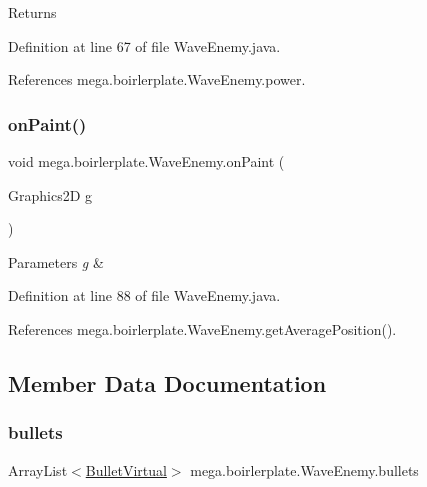 \begin{DoxyReturn}{Returns}

\end{DoxyReturn}


Definition at line 67 of file Wave\+Enemy.\+java.



References mega.\+boirlerplate.\+Wave\+Enemy.\+power.

\mbox{\label{classmega_1_1boirlerplate_1_1_wave_enemy_ab9c8931b661bfa995f124272462537a5}} 
\subsubsection{\texorpdfstring{on\+Paint()}{onPaint()}}
{\footnotesize\ttfamily void mega.\+boirlerplate.\+Wave\+Enemy.\+on\+Paint (\begin{DoxyParamCaption}\item[{Graphics2D}]{g }\end{DoxyParamCaption})}


\begin{DoxyParams}{Parameters}
{\em g} & \\
\hline
\end{DoxyParams}


Definition at line 88 of file Wave\+Enemy.\+java.



References mega.\+boirlerplate.\+Wave\+Enemy.\+get\+Average\+Position().



\subsection{Member Data Documentation}
\mbox{\label{classmega_1_1boirlerplate_1_1_wave_enemy_a982e59e80347fce37d93c286dd44b6bf}} 
\subsubsection{\texorpdfstring{bullets}{bullets}}
{\footnotesize\ttfamily Array\+List$<$\hyperlink{classmega_1_1boirlerplate_1_1_bullet_virtual}{Bullet\+Virtual}$>$ mega.\+boirlerplate.\+Wave\+Enemy.\+bullets\hspace{0.3cm}{\ttfamily [private]}}



